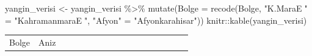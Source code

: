 \documentclass[
  11pt,
  a4paper,
  DIV=11,
  numbers=noendperiod]{scrartcl}
\newenvironment{Shaded}{\begin{snugshade}}{\end{snugshade}}
\newcommand{\AttributeTok}[1]{\textcolor[rgb]{0.40,0.45,0.13}{#1}}
\newcommand{\FunctionTok}[1]{\textcolor[rgb]{0.28,0.35,0.67}{#1}}
\newcommand{\NormalTok}[1]{\textcolor[rgb]{0.00,0.23,0.31}{#1}}
\newcommand{\OtherTok}[1]{\textcolor[rgb]{0.00,0.23,0.31}{#1}}
\newcommand{\SpecialCharTok}[1]{\textcolor[rgb]{0.37,0.37,0.37}{#1}}
\newcommand{\StringTok}[1]{\textcolor[rgb]{0.13,0.47,0.30}{#1}}
\newcounter{none} %
\begin{document}
\begin{Shaded}
\begin{Highlighting}[]
\NormalTok{yangin\_verisi }\OtherTok{\textless{}{-}}\NormalTok{ yangin\_verisi }\SpecialCharTok{\%\textgreater{}\%}
  \FunctionTok{mutate}\NormalTok{(}\AttributeTok{Bolge =} \FunctionTok{recode}\NormalTok{(Bolge, }
                        \StringTok{"K.MaraE"} \OtherTok{=} \StringTok{"KahramanmaraE"}\NormalTok{,}
                        \StringTok{"Afyon"} \OtherTok{=} \StringTok{"Afyonkarahisar"}\NormalTok{))}
\NormalTok{knitr}\SpecialCharTok{::}\FunctionTok{kable}\NormalTok{(yangin\_verisi)}
\end{Highlighting}
\end{Shaded}

{\def\LTcaptype{none} %
\begin{longtable}[]{@{}
  >{\raggedright\arraybackslash}p{}
  >{\raggedleft\arraybackslash}p{}
  >{\raggedleft\arraybackslash}p{}
  >{\raggedleft\arraybackslash}p{}
  >{\raggedleft\arraybackslash}p{}
  >{\raggedleft\arraybackslash}p{}
  >{\raggedleft\arraybackslash}p{}
  >{\raggedleft\arraybackslash}p{}
  >{\raggedleft\arraybackslash}p{}
  >{\raggedleft\arraybackslash}p{}
  >{\raggedleft\arraybackslash}p{}
  >{\raggedleft\arraybackslash}p{}
  >{\raggedleft\arraybackslash}p{}
  >{\raggedleft\arraybackslash}p{}
  >{\raggedleft\arraybackslash}p{}
  >{\raggedleft\arraybackslash}p{}
  >{\raggedleft\arraybackslash}p{}@{}}
\toprule\noalign{}
\begin{minipage}[b]{\linewidth}\raggedright
Bolge
\end{minipage} & \begin{minipage}[b]{\linewidth}\raggedleft
Aniz
\end{minipage} & \begin{minipage}[b]{\linewidth}\raggedleft

\end{minipage}
\end{longtable}}
\end{document}
